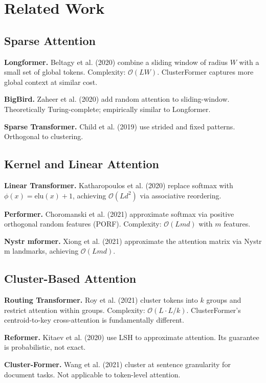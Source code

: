 \section{Related Work}

\subsection{Sparse Attention}

\textbf{Longformer.} Beltagy et al. (2020) combine a sliding window of radius 
$W$ with a small set of global tokens. Complexity: $\mathcal{O}(L W)$. 
ClusterFormer captures more global context at similar cost.

\textbf{BigBird.} Zaheer et al. (2020) add random attention to sliding-window. 
Theoretically Turing-complete; empirically similar to Longformer.

\textbf{Sparse Transformer.} Child et al. (2019) use strided and fixed patterns. 
Orthogonal to clustering.

\subsection{Kernel and Linear Attention}

\textbf{Linear Transformer.} Katharopoulos et al. (2020) replace softmax with 
$\phi(x) = \text{elu}(x) + 1$, achieving $\mathcal{O}(L d^2)$ via 
associative reordering.

\textbf{Performer.} Choromanski et al. (2021) approximate softmax via positive 
orthogonal random features (PORF). Complexity: $\mathcal{O}(L m d)$ with 
$m$ features.

\textbf{Nystr mformer.} Xiong et al. (2021) approximate the attention matrix 
via Nystr m landmarks, achieving $\mathcal{O}(L m d)$.

\subsection{Cluster-Based Attention}

\textbf{Routing Transformer.} Roy et al. (2021) cluster tokens into $k$ groups 
and restrict attention within groups. Complexity: $\mathcal{O}(L \cdot L/k)$. 
ClusterFormer's centroid-to-key cross-attention is fundamentally different.

\textbf{Reformer.} Kitaev et al. (2020) use LSH to approximate attention. Its 
guarantee is probabilistic, not exact.

\textbf{Cluster-Former.} Wang et al. (2021) cluster at sentence granularity for 
document tasks. Not applicable to token-level attention.


